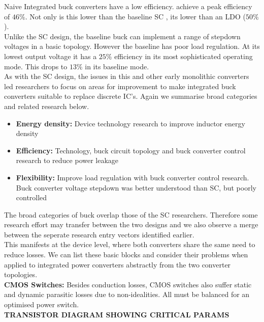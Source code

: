 \documentclass[letterpaper,twocolumn,10pt]{article}
\begin{document}
Naive Integrated buck converters have a low efficiency. \cite{Alimadadi2008} achieve a peak efficiency of $46\%$. Not only is this lower than the baseline SC \cite{Viraj2007}, its lower than an LDO ($50\%$).\\
Unlike the SC design, the baseline buck can implement a range of stepdown voltages in a basic topology. However the baseline has poor load regulation. At its lowest output voltage it has a $25\%$ efficiency in its most sophisticated operating mode. This drops to $13\%$ in its baseline mode.\\ 
As with the SC design, the issues in this and other early monolithic converters led researchers to focus on areas for improvement to make integrated buck converters suitable to replace discrete IC's. Again we summarise broad categories and related research below.
\begin{itemize}
\item \textbf{Energy density: }Device technology research to improve inductor energy density
\item \textbf{Efficiency: }Technology, buck circuit topology and buck converter control research to reduce power leakage
\item \textbf{Flexibility: }Improve load regulation with buck converter control research. Buck converter voltage stepdown was better understood than SC, but poorly controlled
\end{itemize}
The broad categories of buck overlap those of the SC researchers. Therefore some research effort may transfer between the two designs and we also observe a merge between the seperate research entry vectors identified earlier.\\
This manifests at the device level, where both converters share the same need to reduce losses. We can list these basic blocks and consider their problems when applied to integrated power converters abstractly from the two converter topologies.\\  
\textbf{CMOS Switches: }
Besides conduction losses, CMOS switches also suffer static and dynamic parasitic losses due to non-idealities. All must be balanced for an optimised power switch.\\ %
\textbf{TRANSISTOR DIAGRAM SHOWING CRITICAL PARAMS}\\
\end{document}
